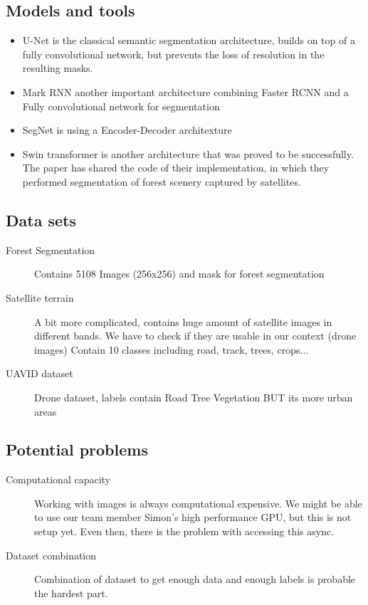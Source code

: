 \documentclass[rnd]{mas_proposal}
\begin{document}
    \subsection{Models and tools}
    \begin{itemize}
        \item U-Net is the classical semantic segmentation architecture, builds on top of a fully convolutional network, but prevents the loss of resolution in the resulting masks.\cite{umar2021forest}
        \item Mark RNN another important architecture combining Faster RCNN and a Fully convolutional network for segmentation \cite{he2018mask}
        \item SegNet is using a Encoder-Decoder architexture \cite{7803544}
        \item Swin transformer is another architecture that was proved to be successfully. The paper \cite{guerin2021satellite} has shared the code of their implementation, in which they performed segmentation of forest scenery captured by satellites.
    \end{itemize}

   
    \subsection{Data sets}
    \begin{description}
        \item[Forest Segmentation] Contains 5108 Images (256x256) and mask for forest segmentation
        \item[Satellite terrain] A bit more complicated, contains huge amount of satellite images in different bands. We have to check if they are usable in our context (drone images) Contain 10 classes including road, track, trees, crops...
        \item[UAVID dataset] Drone dataset, labels contain Road Tree Vegetation BUT its more urban areas
    \end{description}

    \subsection{Potential problems}
    \begin{description}
        \item[Computational capacity] Working with images is always computational expensive. We might be able to use our team member Simon's high performance GPU, but this is not setup yet. Even then, there is the problem with accessing this async.
        \item[Dataset combination] Combination of dataset to get enough data and enough labels is probable the hardest part.
    \end{description}
    





 
\end{document}
